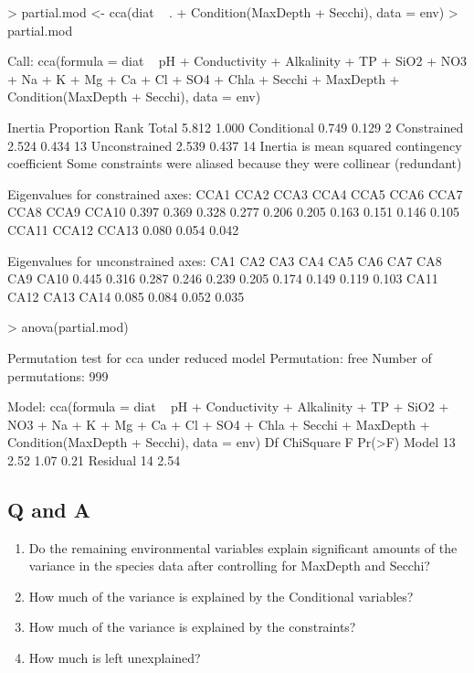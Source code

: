 \documentclass[a4paper,10pt]{article}
\begin{document}
\begin{Schunk}
\begin{Sinput}
> partial.mod <- cca(diat ~ . + Condition(MaxDepth + Secchi), data = env)
> partial.mod
\end{Sinput}
\begin{Soutput}
Call: cca(formula = diat ~ pH + Conductivity + Alkalinity
+ TP + SiO2 + NO3 + Na + K + Mg + Ca + Cl + SO4 + Chla +
Secchi + MaxDepth + Condition(MaxDepth + Secchi), data =
env)

              Inertia Proportion Rank
Total           5.812      1.000     
Conditional     0.749      0.129    2
Constrained     2.524      0.434   13
Unconstrained   2.539      0.437   14
Inertia is mean squared contingency coefficient 
Some constraints were aliased because they were collinear (redundant)

Eigenvalues for constrained axes:
 CCA1  CCA2  CCA3  CCA4  CCA5  CCA6  CCA7  CCA8  CCA9 CCA10 
0.397 0.369 0.328 0.277 0.206 0.205 0.163 0.151 0.146 0.105 
CCA11 CCA12 CCA13 
0.080 0.054 0.042 

Eigenvalues for unconstrained axes:
  CA1   CA2   CA3   CA4   CA5   CA6   CA7   CA8   CA9  CA10 
0.445 0.316 0.287 0.246 0.239 0.205 0.174 0.149 0.119 0.103 
 CA11  CA12  CA13  CA14 
0.085 0.084 0.052 0.035 
\end{Soutput}
\begin{Sinput}
> anova(partial.mod)
\end{Sinput}
\begin{Soutput}
Permutation test for cca under reduced model
Permutation: free
Number of permutations: 999

Model: cca(formula = diat ~ pH + Conductivity + Alkalinity + TP + SiO2 + NO3 + Na + K + Mg + Ca + Cl + SO4 + Chla + Secchi + MaxDepth + Condition(MaxDepth + Secchi), data = env)
         Df ChiSquare    F Pr(>F)
Model    13      2.52 1.07   0.21
Residual 14      2.54            
\end{Soutput}
\end{Schunk}

\subsection*{Q and A}
\begin{enumerate}
\item Do the remaining environmental variables explain significant amounts of the variance in the species data after controlling for MaxDepth and Secchi?
\item How much of the variance is explained by the Conditional variables?
\item How much of the variance is explained by the constraints?
\item How much is left unexplained?
\end{enumerate}
\end{document}

